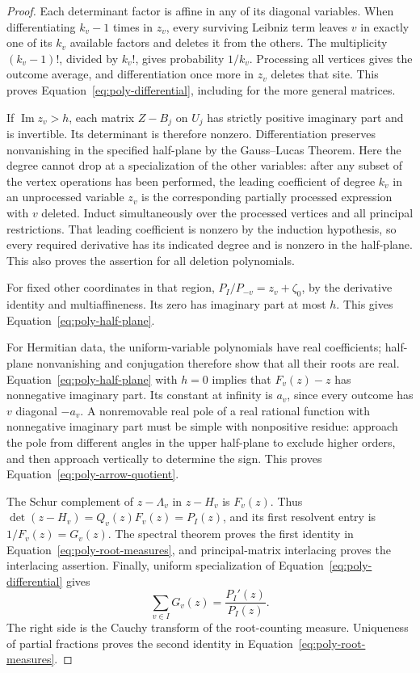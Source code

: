 \begin{proof}
Each determinant factor is affine in any of its diagonal variables.
When differentiating \(k_v-1\) times in \(z_v\), every surviving Leibniz
term leaves \(v\) in exactly one of its \(k_v\) available factors and
deletes it from the others.  The multiplicity \((k_v-1)!\), divided by
\(k_v!\), gives probability \(1/k_v\).  Processing all vertices gives
the outcome average, and differentiation once more in \(z_v\) deletes
that site.  This proves Equation~\eqref{eq:poly-differential}, including
for the more general matrices.

If \(\operatorname{Im}z_v>h\), each matrix \(Z-B_j\) on \(U_j\) has
strictly positive imaginary part and is invertible.  Its determinant is
therefore nonzero.  Differentiation preserves nonvanishing in the
specified half-plane by the Gauss--Lucas Theorem.  Here the degree cannot
drop at a specialization of the other variables: after any subset of
the vertex operations has been performed, the leading coefficient of
degree \(k_v\) in an unprocessed variable \(z_v\) is the corresponding
partially processed expression with \(v\) deleted.  Induct simultaneously
over the processed vertices and all principal restrictions.  That
leading coefficient is nonzero by the induction hypothesis, so every
required derivative has its indicated degree and is nonzero in the
half-plane.  This also proves the assertion for all deletion polynomials.

For fixed other coordinates in that region,
\(P_I/P_{-v}=z_v+\zeta_0\), by the derivative identity and
multiaffineness.  Its zero has imaginary part at most \(h\).
This gives Equation~\eqref{eq:poly-half-plane}.

For Hermitian data, the uniform-variable polynomials have real
coefficients; half-plane nonvanishing and conjugation therefore show
that all their roots are real.  Equation~\eqref{eq:poly-half-plane}
with \(h=0\) implies that \(F_v(z)-z\) has nonnegative imaginary part.
Its constant at infinity is \(a_v\), since every outcome has \(v\)
diagonal \(-a_v\).  A nonremovable real pole of a real rational function
with nonnegative imaginary part must be simple with nonpositive
residue: approach the pole from different angles in the upper
half-plane to exclude higher orders, and then approach vertically to
determine the sign.  This proves
Equation~\eqref{eq:poly-arrow-quotient}.

The Schur complement of \(z-\Lambda_v\) in \(z-H_v\) is \(F_v(z)\).
Thus \(\det(z-H_v)=Q_v(z)F_v(z)=P_I(z)\), and its first resolvent
entry is \(1/F_v(z)=G_v(z)\).  The spectral theorem proves the first
identity in Equation~\eqref{eq:poly-root-measures}, and principal-matrix
interlacing proves the interlacing assertion.  Finally, uniform
specialization of Equation~\eqref{eq:poly-differential} gives
\[
                      \sum_{v\in I}G_v(z)=\frac{P_I'(z)}{P_I(z)}.
\]
The right side is the Cauchy transform of the root-counting measure.
Uniqueness of partial fractions proves the second identity in
Equation~\eqref{eq:poly-root-measures}.
\end{proof}

